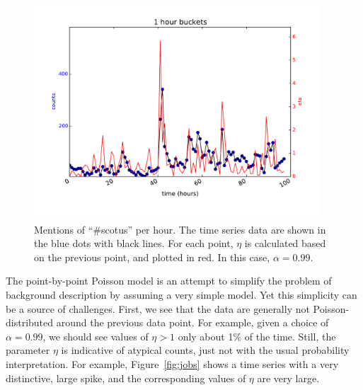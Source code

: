 \documentclass{article}
\begin{document}
\begin{figure} 
\begin{center}
\includegraphics[width=0.95\textwidth]{fig/scotus_pbppm.pdf} \caption{Mentions
of ``\#scotus'' per hour. The time series data are shown in the blue dots with
black lines. For each point, $\eta$ is calculated based on the previous point, and
plotted in red. In this case, $\alpha=0.99$. }
\label{fig:scotus1}
\end{center}
\end{figure}

The point-by-point Poisson model is an attempt to simplify the problem of
background description by assuming a very simple model. Yet this
simplicity can be a source of challenges. First, we see that the data are
generally not Poisson-distributed around the previous data point. For example,
given a choice of $\alpha=0.99$, we should see values of $\eta>1$ only about 1\% of the
time. Still, the parameter $\eta$ is indicative of atypical counts, just not with
the usual probability interpretation. For example, Figure~\ref{fig:jobs} shows a time series with a
very distinctive, large spike, and the corresponding values of $\eta$ are very 
large.
\end{document}
